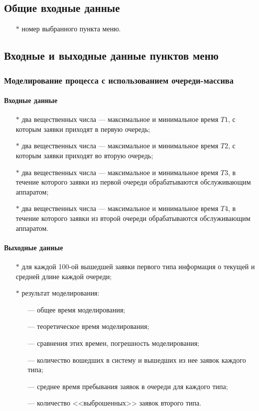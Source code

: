 \documentclass[a4paper,12pt]{extarticle}
\begin{document}
\subsection{Общие входные данные}
\begin{itemize}
    \item[$*$] номер выбранного пункта меню.
\end{itemize}

\subsection{Входные и выходные данные пунктов меню}
\subsubsection{Моделирование процесса с использованием очереди-массива}

\paragraph{Входные данные}
\begin{itemize}
    \item[$*$] два вещественных числа --- максимальное и минимальное время $T1$, с которым заявки приходят в первую очередь;
    \item[$*$] два вещественных числа --- максимальное и минимальное время $T2$, с которым заявки приходят во вторую очередь;
    \item[$*$] два вещественных числа --- максимальное и минимальное время $T3$, в течение которого заявки из первой очереди обрабатываются обслуживающим аппаратом;
    \item[$*$] два вещественных числа --- максимальное и минимальное время $T4$, в течение которого заявки из второй очереди обрабатываются обслуживающим аппаратом.
\end{itemize}

\paragraph{Выходные данные}
\begin{itemize}
    \item[$*$] для каждой 100-ой вышедшей заявки первого типа информация о текущей и средней длине каждой очереди;
    \item[$*$] результат моделирования:
    \begin{itemize}
    	\item[---] общее время моделирования;
    	\item[---] теоретическое время моделирования;
    	\item[---] сравнения этих времен, погрешность моделирования;
    	\item[---] количество вошедших в систему и вышедших из нее заявок каждого типа;
    	\item[---] среднее время пребывания заявок в очереди для каждого типа;
    	\item[---] количество <<выброшенных>> заявок второго типа.
    \end{itemize}
\end{itemize}
\end{document}
